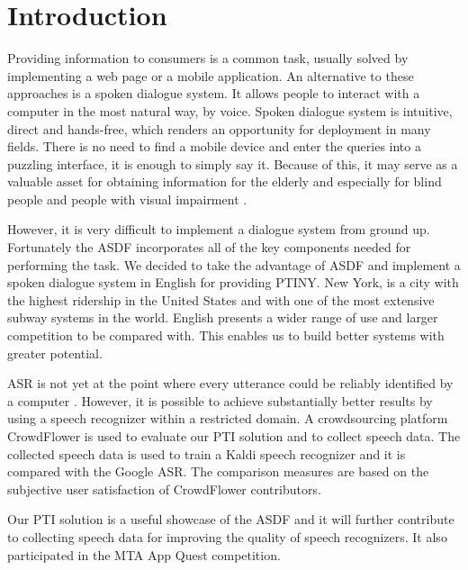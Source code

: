 

\chapter*{Introduction}

Providing information to consumers is a common task, usually solved by implementing a web page or a mobile application.
An alternative to these approaches is a spoken dialogue system.
It allows people to interact with a computer in the most natural way, by voice.
Spoken dialogue system is intuitive, direct and hands-free, which renders an opportunity for deployment in many fields.
There is no need to find a mobile device and enter the queries into a puzzling interface, it is enough to simply say it.
Because of this, it may serve as a valuable asset for obtaining information for the elderly and especially for blind people and people with visual impairment \cite{blind}. %

However, it is very difficult to implement a dialogue system from ground up.
Fortunately the \acf{ASDF} \cite{asdf} incorporates all of the key components needed for performing the task.
We decided to take the advantage of \ac{ASDF} and implement a spoken dialogue system in English for providing \acf{PTINY}.
New York, is a city with the highest ridership in the United States and with one of the most extensive subway systems in the world. %
English presents a wider range of use and larger competition to be compared with.
This enables us to build better systems with greater potential.

\acf{ASR} is not yet at the point where every utterance could be reliably identified by a computer \cite{asr}.
However, it is possible to achieve substantially better results by using a speech recognizer within a restricted domain.
A crowdsourcing platform CrowdFlower is used to evaluate our \ac{PTI} solution and to collect speech data.
The collected speech data is used to train a Kaldi speech recognizer and it is compared with the Google \ac{ASR}.
The comparison measures are based on the subjective user satisfaction of CrowdFlower contributors. %

Our \ac{PTI} solution is a useful showcase of the \ac{ASDF} and it will further contribute to collecting speech data for improving the quality of speech recognizers. It also participated in the \ac{MTA} App Quest competition.

